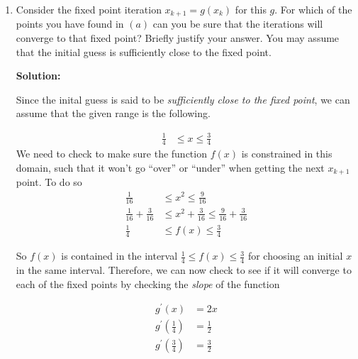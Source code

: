 \documentclass[12pt]{article}
\begin{document}
\begin{enumerate}
\begin{enumerate}
  {\bf Solution:}

  In order to find the {\em fixed points} of the above function, we need to find
  the zeros

  \begin{align*}
    x^{2} + \frac{3}{16} &= x\\
    x^{2} - x + \frac{3}{16} &= 0\\
    \Rightarrow x_{1} &= \frac{1}{4}\\
    \Rightarrow x_{2} &= \frac{3}{4}
  \end{align*}
  \item Consider the fixed point iteration $x_{k+1} = g\left( x_{k}\right)$ for this $g$.
  For which of the points you have found in $(a)$ can you be sure that the iterations
  will converge to that fixed point? Briefly justify your answer. You may assume that
  the initial guess is sufficiently close to the fixed point.

{\bf Solution:}

  Since the inital guess is said to be {\em sufficiently close to the fixed point},
  we can assume that the given range is the following.

  \begin{align*}
    \frac{1}{4} &\leq x \leq \frac{3}{4}
  \end{align*}
  We need to check to make sure the function $f(x)$ is constrained in this domain, such that it won't go ``over'' or ``under'' when getting the next $x_{k+1}$ point. To do so
  \begin{align*}
    \frac{1}{16} &\leq x^{2} \leq \frac{9}{16}\\
    \frac{1}{16} + \frac{3}{16} &\leq x^{2} + \frac{3}{16} \leq \frac{9}{16} + \frac{3}{16}\\
    \frac{1}{4} &\leq f(x) \leq \frac{3}{4}
    \end{align*}

    So $f(x)$ is contained in the interval $\frac{1}{4} \leq f(x) \leq \frac{3}{4}$ for
    choosing an initial $x$ in the same interval. Therefore, we can now check to see if it will
    converge to each of the fixed points by checking the {\em slope} of the function

    \begin{align*}
      g^{\prime}(x) &= 2x\\
      g^{\prime}\left(\frac{1}{4}\right) &= \frac{1}{2}\\
      g^{\prime}\left(\frac{3}{4}\right) &= \frac{3}{2}
    \end{align*}


\end{enumerate}
\end{enumerate}
\end{document}
